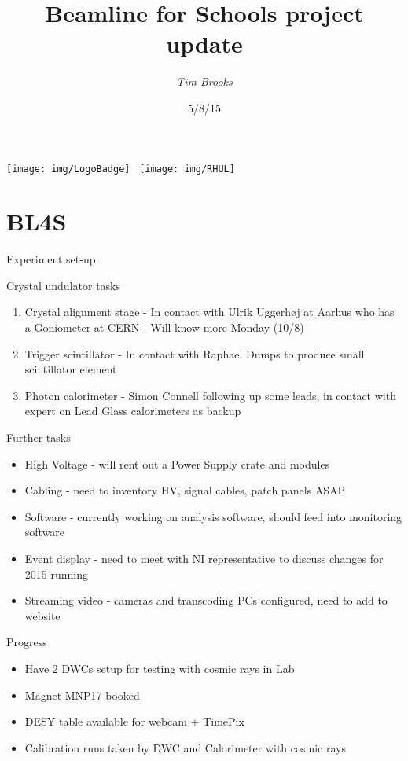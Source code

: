 \documentclass{beamer}
\title[Beamline for Schools\hspace{2em}\insertframenumber/
\inserttotalframenumber]{Beamline for Schools project update}
\author{\emph{Tim Brooks}}
\institute{CERN / RHUL}
\date{5/8/15}
\begin{document}
\begin{frame}
\titlepage{}
\centering
\texttt{[image: img/LogoBadge]}
\,
\texttt{[image: img/RHUL]}
\end{frame}

\section{BL4S}

\begin{frame}{Experiment set-up}
\begin{figure}\centering
    
\end{figure}
\end{frame}

\begin{frame}{Crystal undulator tasks}
\begin{enumerate}
    \item Crystal alignment stage - In contact with Ulrik Uggerh\o j at Aarhus who has a Goniometer at CERN - Will know more Monday (10/8)
    \item Trigger scintillator - In contact with Raphael Dumps to produce small scintillator element
    \item Photon calorimeter - Simon Connell following up some leads, in contact with expert on Lead Glass calorimeters as backup
\end{enumerate}
\end{frame}

\begin{frame}{Further tasks}
\begin{itemize}
    \item High Voltage - will rent out a Power Supply crate and modules
    \item Cabling - need to inventory HV, signal cables, patch panels ASAP
    \item Software - currently working on analysis software, should feed into monitoring software
    \item Event display - need to meet with NI representative to discuss changes for 2015 running
    \item Streaming video - cameras and transcoding PCs configured, need to add to website
\end{itemize}
\end{frame}

\begin{frame}{Progress}
\begin{itemize}
\item Have 2 DWCs setup for testing with cosmic rays in Lab
\item Magnet MNP17 booked
\item DESY table available for webcam + TimePix
\item Calibration runs taken by DWC and Calorimeter with cosmic rays
\end{itemize}
\end{frame}
\end{document}
